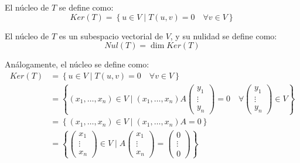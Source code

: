 \begin{definicion}
    El núcleo de $T$ se define como:
    $$Ker(T) = \left\{ u\in V \mid T(u,v)=0 \quad 
    \forall v\in V \right\}$$

    El núcleo de $T$ es un subespacio vectorial de $V$, y su nulidad se define como:
    $$Nul(T) = \dim Ker(T)$$

    Análogamente, el núcleo se define como:
    \begin{equation*}\begin{split}
        Ker(T) &= \left\{ u\in V \mid T(u,v)=0 \quad  \forall v\in V \right\} \\
        & = \left\{ (x_1, \dots, x_n)\in V \mid (x_1, \dots, x_n)A\left(\begin{array}{c}
            y_1 \\ \vdots \\ y_n
        \end{array} \right)=0 \quad 
        \forall \left(\begin{array}{c}
            y_1 \\ \vdots \\ y_n
        \end{array} \right)\in V \right\} \\
        &= \left\{ (x_1, \dots, x_n)\in V \mid (x_1, \dots, x_n)A=0\right\}\\
        &= \left\{ \left(\begin{array}{c}
            x_1 \\ \vdots \\ x_n
        \end{array} \right) \in V \mid A\left(\begin{array}{c}
            x_1 \\ \vdots \\ x_n
        \end{array} \right)=\left(\begin{array}{c}
            0 \\ \vdots \\ 0
        \end{array} \right)\right\}
    \end{split}\end{equation*}
\end{definicion}

